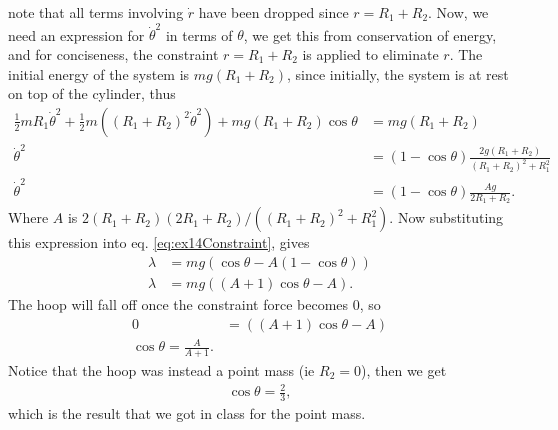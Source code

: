 \documentclass[10pt]{article}
\begin{document}
note that all terms involving $\dot r$ have been dropped since $r=R_1+R_2$.  
Now, we need an expression for $\dot\theta^2$ in terms of $\theta$, 
we get this from conservation of energy, and for conciseness, the constraint
$r=R_1+R_2$ is applied to eliminate $r$.  The initial energy of the system is
$mg(R_1+R_2)$, since initially, the system is at rest on top of the cylinder,
thus
\begin{align*}
  \frac{1}{2}mR_1\dot\theta^2 + \frac{1}{2}m\left( (R_1+R_2)^2\dot\theta^2 \right) + mg(R_1+R_2)\cos\theta &= mg(R_1+R_2)\\
  \dot\theta^2 &= (1-\cos\theta)\frac{2g(R_1+R_2)}{(R_1+R_2)^2+R_1^2}\\
  \dot\theta^2 &= (1-\cos\theta)\frac{Ag}{2R_1+R_2}.
\end{align*}
Where $A$ is $2(R_1+R_2)(2R_1+R_2)/\left( (R_1+R_2)^2+R_1^2 \right)$.  Now 
substituting this expression into eq. \ref{eq:ex14Constraint}, gives
\begin{align*}
  \lambda &= mg(\cos\theta - A(1-\cos\theta))\\
  \lambda &= mg((A+1)\cos\theta-A).
\end{align*}
The hoop will fall off once the constraint force becomes 0, so
\begin{align*}
  0 &= ((A+1)\cos\theta-A)\\
  \cos\theta = \frac{A}{A+1}.
\end{align*}
Notice that the hoop was instead a point mass (ie $R_2=0$), then we get
\begin{align*}
  \cos\theta = \frac{2}{3},
\end{align*}
which is the result that we got in class for the point mass.
\end{document}
